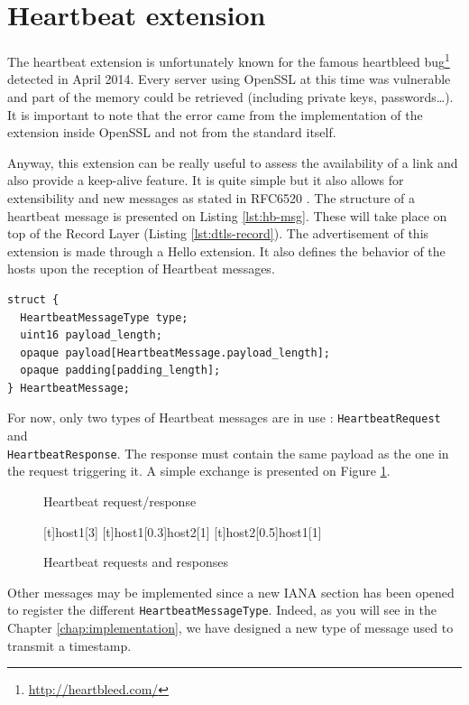 
\section{Heartbeat extension}

The heartbeat extension is unfortunately known for the famous heartbleed bug\footnote{\url{http://heartbleed.com/}} detected in April 2014. Every server using OpenSSL at this time was vulnerable and part of the memory could be retrieved (including private keys, passwords\dots). It is important to note that the error came from the implementation of the extension inside OpenSSL and not from the standard itself.

Anyway, this extension can be really useful to assess the availability of a link and also provide a keep-alive feature. It is quite simple but it also allows for extensibility and new messages as stated in RFC6520 \cite{rfc6520}. The structure of a heartbeat message is presented on Listing \ref{lst:hb-msg}. These will take place on top of the Record Layer (Listing \ref{lst:dtls-record}). The advertisement of this extension is made through a Hello extension. It also defines the behavior of the hosts upon the reception of Heartbeat messages.

\begin{lstlisting}[caption=Heartbeat message, label=lst:hb-msg]
struct {
  HeartbeatMessageType type;
  uint16 payload_length;
  opaque payload[HeartbeatMessage.payload_length];
  opaque padding[padding_length];
} HeartbeatMessage;
\end{lstlisting}

For now, only two types of Heartbeat messages are in use : \texttt{HeartbeatRequest} and\\ \texttt{HeartbeatResponse}. The response must contain the same payload as the one in the request triggering it. A simple exchange is presented on Figure \ref{fig:heartbeat}.

\begin{figure}[!h]
\centering
\begin{msc}[r]{Heartbeat request/response}

\setlength{\instfootheight}{0em}
\setlength{\instheadheight}{0em}
\setlength{\instdist}{0.7\linewidth}
\setlength{\levelheight}{3em}


[t]{}{host1}[3]
\nextlevel
{}[t]{host1}[0.3]{host2}[1]
\nextlevel
{}[t]{host2}[0.5]{host1}[1]
\nextlevel
\nextlevel
\end{msc}
\caption{Heartbeat requests and responses}
\label{fig:heartbeat}
\end{figure}

Other messages may be implemented since a new IANA section has been opened to register the different \texttt{HeartbeatMessageType}. Indeed, as you will see in the Chapter \ref{chap:implementation}, we have designed a new type of message used to transmit a timestamp.